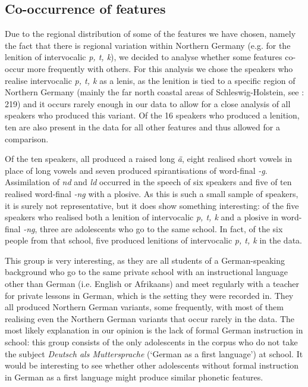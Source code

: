\documentclass[output=paper]{langsci/langscibook}
\begin{document}
\subsection{Co-occurrence of features}
\label{sec:stuhl:4.7}

Due to the regional distribution of some of the features we have chosen, namely the fact that there is regional variation within Northern Germany (e.g. for the lenition of intervocalic \textit{p, t, k}), we decided to analyse whether some features co-occur more frequently with others. For this analysis we chose the speakers who realise intervocalic \textit{p, t, k} as a lenis, as the lenition is tied to a specific region of Northern Germany (mainly the far north coastal areas of Schleswig-Holstein, see \citealt{elmentaler_norddeutscher_2015}: 219) and it occurs rarely enough in our data to allow for a close analysis of all speakers who produced this variant. Of the 16 speakers who produced a lenition, ten are also present in the data for all other features and thus allowed for a comparison. 

Of the ten speakers, all produced a raised long \textit{ä}, eight realised short vowels in place of long vowels and seven produced spirantisations of word-final \textit{-g}. Assimilation of \textit{nd} and \textit{ld} occurred in the speech of six speakers and five of ten realised word-final \textit{-ng} with a plosive. As this is such a small sample of speakers, it is surely not representative, but it does show something interesting: of the five speakers who realised both a lenition of intervocalic \textit{p, t, k} and a plosive in word-final \textit{-ng}, three are adolescents who go to the same school. In fact, of the six people from that school, five produced lenitions of intervocalic \textit{p, t, k} in the data. 

This group is very interesting, as they are all students of a German-speaking background who go to the same private school with an instructional language other than German (i.e. English or Afrikaans) and meet regularly with a teacher for private lessons in German, which is the setting they were recorded in. They all produced Northern German variants, some frequently, with most of them realising even the Northern German variants that occur rarely in the data. The most likely explanation in our opinion is the lack of formal German instruction in school: this group consists of the only adolescents in the corpus who do not take the subject \textit{Deutsch als Muttersprache} (‘German as a first language’) at school. It would be interesting to see whether other adolescents without formal instruction in German as a first language might produce similar phonetic features.
\end{document}
